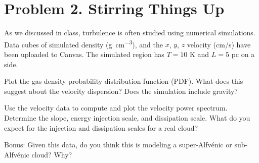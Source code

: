 \documentclass[11pt]{article}
\newenvironment{tight_enumerate}{
\begin{enumerate}[label=(\alph*)]
\setlength{\itemsep}{3pt}
\setlength{\parskip}{0pt}
}{\end{enumerate}}
\begin{document}
\newpage
\section*{Problem 2. Stirring Things Up}
As we discussed in class, turbulence is often studied using numerical simulations. Data cubes of simulated density (\si{g.cm^{-3}}), and the $x$, $y$, $z$ velocity (\si{cm/s}) have been uploaded to Canvas. The simulated region has $T = 10$ \si{K} and $L = 5$ \si{pc} on a side.
\begin{tight_enumerate}
\item Plot the gas density probability distribution function (PDF). What does this suggest about the velocity dispersion? Does the simulation include gravity?
\item Use the velocity data to compute and plot the velocity power spectrum. Determine the slope, energy injection scale, and dissipation scale. What do you expect for the injection and dissipation scales for a real cloud?
\item Bonus: Given this data, do you think this is modeling a super-Alfv\'enic or sub-Alfv\'enic cloud? Why?
\end{tight_enumerate}
\end{document}
